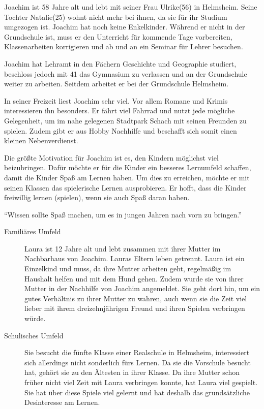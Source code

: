 \begin{description}
\begin{description}
			\item[Familiäres Umfeld]{Joachim ist 58 Jahre alt und lebt mit seiner Frau Ulrike(56) in Helmsheim. Seine Tochter Natalie(25) wohnt nicht mehr bei ihnen, da sie für ihr Studium umgezogen ist. Joachim hat noch keine Enkelkinder. Während er nicht in der Grundschule ist, muss er den Unterricht für kommende Tage vorbereiten, Klassenarbeiten korrigieren und ab und an ein Seminar für Lehrer besuchen.}
			\item[Schulisches Umfeld]{Joachim hat Lehramt in den Fächern Geschichte und Geographie studiert, beschloss jedoch mit 41 das Gymnasium zu verlassen und an der Grundschule weiter zu arbeiten. Seitdem arbeitet er bei der Grundschule Helmsheim.}
			\item[Interessen und Hobbys]{In seiner Freizeit liest Joachim sehr viel. Vor allem Romane und Krimis interessieren ihn besonders. Er fährt viel Fahrrad und nutzt jede mögliche Gelegenheit, um im nahe gelegenen Stadtpark Schach mit seinen Freunden zu spielen. Zudem gibt er aus Hobby Nachhilfe und beschafft sich somit einen kleinen Nebenverdienst.}
			\item[Motivation]{Die größte Motivation für Joachim ist es, den Kindern möglichst viel beizubringen. Dafür möchte er für die Kinder ein besseres Lernumfeld schaffen, damit die Kinder Spaß am Lernen haben. Um dies zu erreichen, möchte er mit seinen Klassen das spielerische Lernen ausprobieren. Er hofft, dass die Kinder freiwillig lernen (spielen), wenn sie auch Spaß daran haben.}
			\item{\enquote{Wissen sollte Spaß machen, um es in jungen Jahren nach vorn zu bringen.}}
		\end{description}
		\item[Laura Dietz: Die Rennfahrerin]<TODO: Bild>\hfill
		\begin{description}
			\item[Familiäres Umfeld]{Laura ist 12 Jahre alt und lebt zusammen mit ihrer Mutter im Nachbarhaus von Joachim. Lauras Eltern leben getrennt. Laura ist ein Einzelkind und muss, da ihre Mutter arbeiten geht, regelmäßig im Haushalt helfen und mit dem Hund gehen. Zudem wurde sie von ihrer Mutter in der Nachhilfe von Joachim angemeldet. Sie geht dort hin, um ein gutes Verhältnis zu ihrer Mutter zu wahren, auch wenn sie die Zeit viel lieber mit ihrem dreizehnjährigen Freund und ihren Spielen verbringen würde.}
			\item[Schulisches Umfeld]{Sie besucht die fünfte Klasse einer Realschule in Helmsheim, interessiert sich allerdings nicht sonderlich fürs Lernen. Da sie die Vorschule besucht hat, gehört sie zu den Ältesten in ihrer Klasse. Da ihre Mutter schon früher nicht viel Zeit mit Laura verbringen konnte, hat Laura viel gespielt. Sie hat über diese Spiele viel gelernt und hat deshalb das grundsätzliche Desinteresse am Lernen.}

\end{description}
\end{description}
